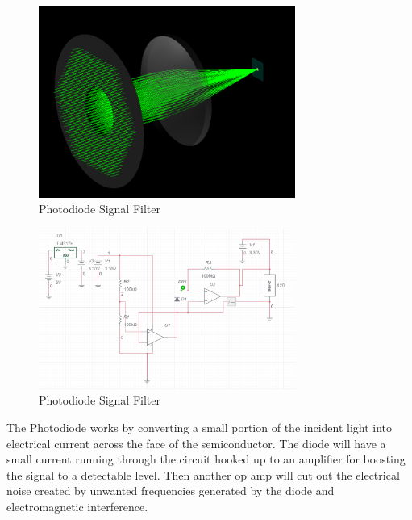 \begin{figure}[H]
    \caption{Photodiode Signal Filter}
    \centering
    \includegraphics[width=0.75\textwidth]{images/ColimatedBeam.png}
\end{figure}


\begin{figure}[H]
    \caption{Photodiode Signal Filter}
    \centering
    \includegraphics[width=0.75\textwidth]{images/ElectricalSignalFilteringSD1.png}
\end{figure}


The Photodiode works by converting a small portion of the incident light into electrical current across the face of the semiconductor. The diode will have a small current running through the circuit hooked up to an amplifier for boosting the signal to a detectable level. Then another op amp will cut out the electrical noise created by unwanted frequencies generated by the diode and electromagnetic interference.

